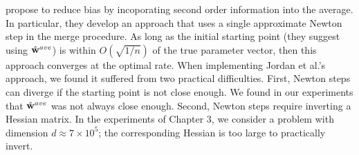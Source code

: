 \documentclass[thesis.tex]{subfiles}
\begin{document}
\citet{jordan2016communication} propose to reduce bias by incoporating second order information into the average.
In particular, they develop an approach that uses a single approximate Newton step in the merge procedure.
As long as the initial starting point (they suggest using $\hat{\mathbf w}^{ave}$) is within $O(\sqrt{1/n})$ of the true parameter vector,
then this approach converges at the optimal rate.
When implementing Jordan et al.'s approach, we found it suffered from two practical difficulties.
First, Newton steps can diverge if the starting point is not close enough.
We found in our experiments that $\hat{\mathbf w}^{ave}$ was not always close enough.
Second, Newton steps require inverting a Hessian matrix.
In the experiments of Chapter 3, we consider a problem with dimension $d\approx7\times10^5$;
the corresponding Hessian is too large to practically invert.
\end{document}
